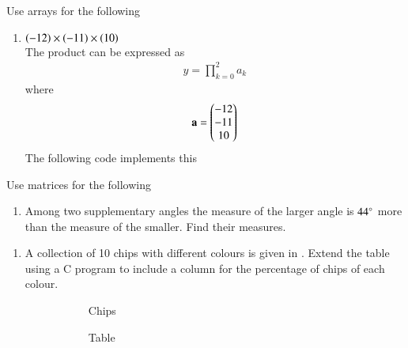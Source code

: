 Use arrays for the following
\begin{enumerate}[label=\thesubsection.\arabic*, ref=\thesubsection.\theenumi,resume*]
	\item $\left(-12\right)\times  \left(-11\right)\times \left(10\right) $
		\\
		\solution The product can be expressed as
		\begin{align}
			y = \prod_{k=0}^{2}a_k
		\end{align}
		where
		\begin{align}
			\mathbf{a} = \begin{pmatrix}-12 \\ -11 \\ 10\end{pmatrix}
		\end{align}
	The following code implements this
	
	\begin{multicols}{3}
	\item $\brak{9}\times\brak{-3} \times \brak{-6}$ 
	\item $\brak{-18}\times\brak{-5} \times \brak{-4}$ 
	\item $\brak{-3}\times\brak{-6} \times \brak{-2} \times \brak{-1}$ 
\end{multicols}
\end{enumerate}
Use matrices for the following
\begin{enumerate}[label=\thesubsection.\arabic*, ref=\thesubsection.\theenumi,resume*]
\item Among two supplementary angles the measure of the larger angle is $44\degree$  more than the measure of the smaller. Find their measures.
\end{enumerate}
\begin{enumerate}[label=\thesubsection.\arabic*, ref=\thesubsection.\theenumi,resume*]
\item 
	A collection of 10 chips with different colours is given in 
.
Extend the table using a C program
to include a column for the percentage of chips of each colour.
\begin{figure}[H]
  \centering
  \begin{subfigure}{0.25\textwidth}
    
    \caption{Chips}
  \end{subfigure}
  \hfill
\begin{subfigure}{0.4\textwidth}
	  
    \caption{Table}
  \end{subfigure}
  \caption{}
  \label{fig:percent2}
\end{figure}
	\solution 
	
\end{enumerate}

